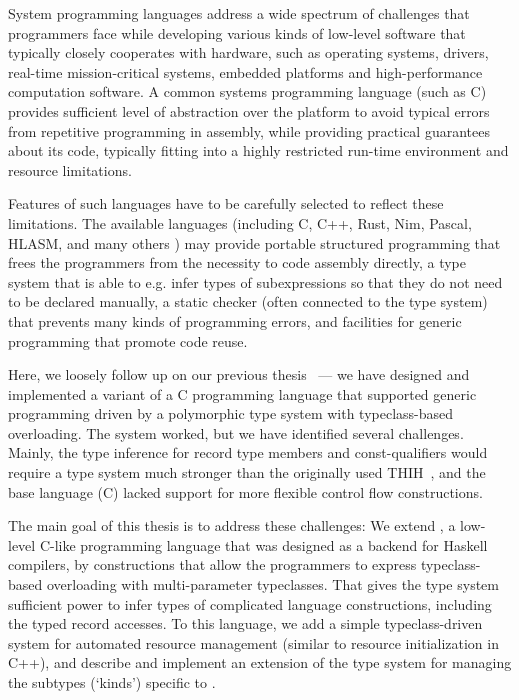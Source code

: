 

System programming languages address a wide spectrum of challenges that programmers face while developing various kinds of low-level software that typically closely cooperates with hardware, such as operating systems, drivers, real-time mission-critical systems, embedded platforms and high-performance computation software.
A common systems programming language (such as C) provides sufficient level of abstraction over the platform to avoid typical errors from repetitive programming in assembly, while providing practical guarantees about its code, typically fitting into a highly restricted run-time environment and resource limitations.

Features of such languages have to be carefully selected to reflect these limitations.
The available languages (including C, C++, Rust, Nim, Pascal, HLASM, and many others ) may provide portable structured programming that frees the programmers from the necessity to code assembly directly, a type system that is able to e.g. infer types of subexpressions so that they do not need to be declared manually, a static checker (often connected to the type system) that prevents many kinds of programming errors, and facilities for generic programming that promote code reuse.

Here, we loosely follow up on our previous thesis~\cite{klepl2020type} --- we have designed and implemented a variant of a C programming language that supported generic programming driven by a polymorphic type system with typeclass-based overloading.
The system worked, but we have identified several challenges.
Mainly, the type inference for record type members and const-qualifiers would require a type system much stronger than the originally used THIH~\cite{jones1999typing}, and the base language (C) lacked support for more flexible control flow constructions.

The main goal of this thesis is to address these challenges: We extend \cmm, a low-level C-like programming language that was designed as a backend for Haskell compilers, by constructions that allow the programmers to express typeclass-based overloading with multi-parameter typeclasses. That gives the type system sufficient power to infer types of complicated language constructions, including the typed record accesses. To this language, we add a simple typeclass-driven system for automated resource management (similar to resource initialization in C++), and describe and implement an extension of the type system for managing the subtypes (`kinds') specific to \cmm.

